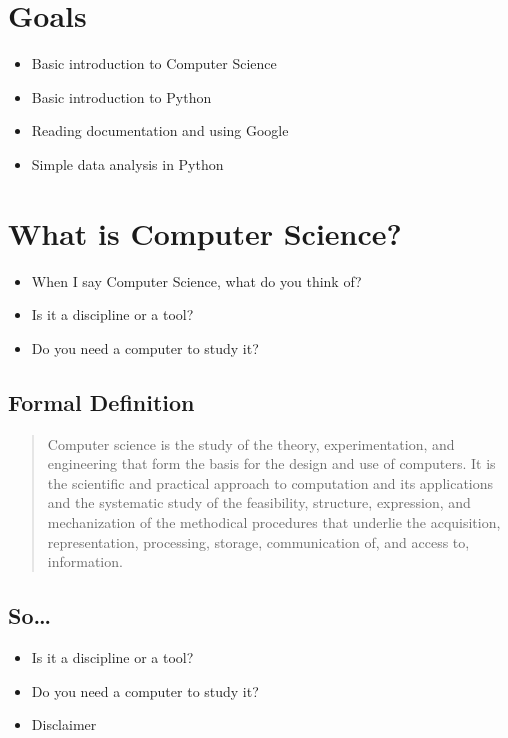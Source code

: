 \documentclass[11pt]{article}
\author{Rodda John}
\date{\today}
\title{}
\begin{document}
\section{Goals}
\label{sec:org3d5957a}
\begin{itemize}
\item Basic introduction to Computer Science
\item Basic introduction to Python
\item Reading documentation and using Google
\item Simple data analysis in Python
\end{itemize}


\section{What is Computer Science?}
\label{sec:org0e95733}
\begin{itemize}
\item When I say Computer Science, what do you think of?
\item Is it a discipline or a tool?
\item Do you need a computer to study it?
\end{itemize}

\subsection{Formal Definition}
\label{sec:orge852e01}
\begin{quote}
Computer science is the study of the theory, experimentation, and engineering that form the basis for the design and use of computers. It is the scientific and practical approach to computation and its applications and the systematic study of the feasibility, structure, expression, and mechanization of the methodical procedures that underlie the acquisition, representation, processing, storage, communication of, and access to, information.
\end{quote}

\subsection{So\ldots{}}
\label{sec:org8a513fc}
\begin{itemize}
\item Is it a discipline or a tool?
\item Do you need a computer to study it?
\item Disclaimer
\end{itemize}
\end{document}
